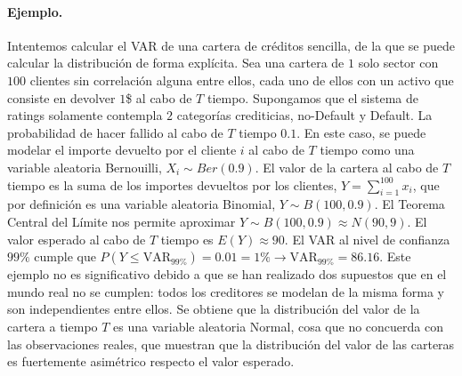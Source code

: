 \paragraph{Ejemplo.} Intentemos calcular el VAR de una cartera de cr\'editos
sencilla, de la que se puede calcular la distribuci\'on de forma expl\'icita. 
Sea una cartera de $1$ solo sector con $100$ clientes sin correlaci\'on alguna
entre ellos, cada uno de ellos con un activo que consiste en devolver $1$\$ al 
cabo de $T$ tiempo. Supongamos que el sistema de ratings solamente contempla 
$2$ categor\'ias crediticias, no-Default y Default. La probabilidad de hacer 
fallido al cabo de $T$ tiempo $0.1$.
\newline
\newline
En este caso, se puede modelar el importe devuelto por el cliente $i$ al cabo 
de $T$ tiempo como una variable aleatoria Bernouilli, $X_i \sim Ber(0.9)$. El 
valor de la cartera al cabo de $T$ tiempo es la suma de los importes devueltos 
por los clientes, $Y = \sum_{i=1}^{100} x_i$, que por definici\'on es una 
variable aleatoria Binomial, $Y \sim B(100,0.9)$. El Teorema Central del 
L\'imite nos permite aproximar $Y \sim B(100,0.9) \approx N(90, 9)$.
\newline
\newline
El valor esperado al cabo de $T$ tiempo es $E(Y) \approx 90$. El VAR al nivel 
de confianza $99\%$ cumple que $P(Y \leq \textrm{VAR}_{99\%}) = 0.01 = 1\% 
\longrightarrow \textrm{VAR}_{99\%}=86.16$.
\newline
\newline
Este ejemplo no es significativo debido a que se han realizado dos supuestos 
que en el mundo real no se cumplen: todos los creditores se modelan de la misma 
forma y son independientes entre ellos. Se obtiene que la distribuci\'on del 
valor de la cartera a tiempo $T$ es una variable aleatoria Normal, cosa que no
concuerda con las observaciones reales, que muestran que la distribuci\'on del 
valor de las carteras es fuertemente asim\'etrico respecto el valor esperado.


